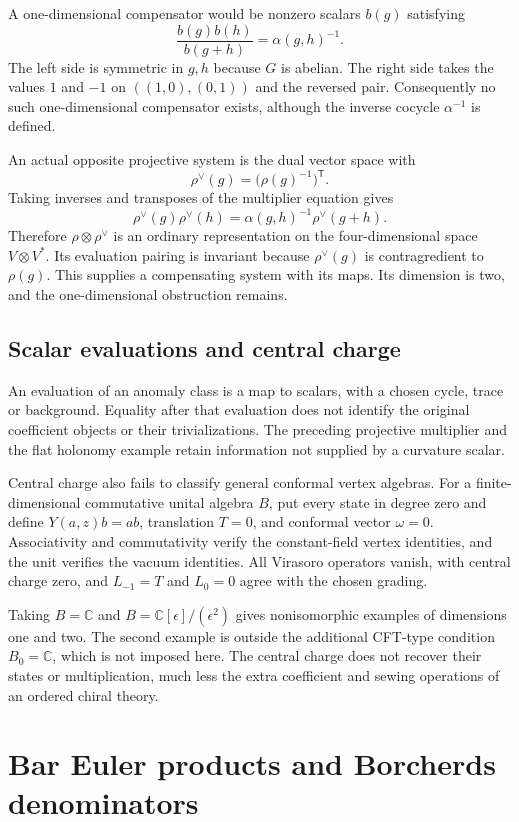 A one-dimensional compensator would be nonzero scalars $b(g)$ satisfying
\[
 \frac{b(g)b(h)}{b(g+h)}=\alpha(g,h)^{-1}.
\]
The left side is symmetric in $g,h$ because $G$ is abelian.
The right side takes the values $1$ and $-1$ on $((1,0),(0,1))$ and the reversed pair.
Consequently no such one-dimensional compensator exists, although the inverse cocycle $\alpha^{-1}$ is defined.

An actual opposite projective system is the dual vector space with
\[
 \rho^\vee(g)=\bigl(\rho(g)^{-1}\bigr)^{\mathsf T}.
\]
Taking inverses and transposes of the multiplier equation gives
\[
 \rho^\vee(g)\rho^\vee(h)=\alpha(g,h)^{-1}\rho^\vee(g+h).
\]
Therefore $\rho\otimes\rho^\vee$ is an ordinary representation on the four-dimensional space $V\otimes V^*$.
Its evaluation pairing is invariant because $\rho^\vee(g)$ is contragredient to $\rho(g)$.
This supplies a compensating system with its maps.
Its dimension is two, and the one-dimensional obstruction remains.

\section{Scalar evaluations and central charge}

An evaluation of an anomaly class is a map to scalars, with a chosen cycle, trace or background.
Equality after that evaluation does not identify the original coefficient objects or their trivializations.
The preceding projective multiplier and the flat holonomy example retain information not supplied by a curvature scalar.

Central charge also fails to classify general conformal vertex algebras.
For a finite-dimensional commutative unital algebra $B$, put every state in degree zero and define $Y(a,z)b=ab$, translation $T=0$, and conformal vector $\omega=0$.
Associativity and commutativity verify the constant-field vertex identities, and the unit verifies the vacuum identities.
All Virasoro operators vanish, with central charge zero, and $L_{-1}=T$ and $L_0=0$ agree with the chosen grading.

Taking $B=\mathbb C$ and $B=\mathbb C[\epsilon]/(\epsilon^2)$ gives nonisomorphic examples of dimensions one and two.
The second example is outside the additional CFT-type condition $B_0=\mathbb C$, which is not imposed here.
The central charge does not recover their states or multiplication, much less the extra coefficient and sewing operations of an ordered chiral theory.

\chapter{Bar Euler products and Borcherds denominators}\label{chap:borcherds}

